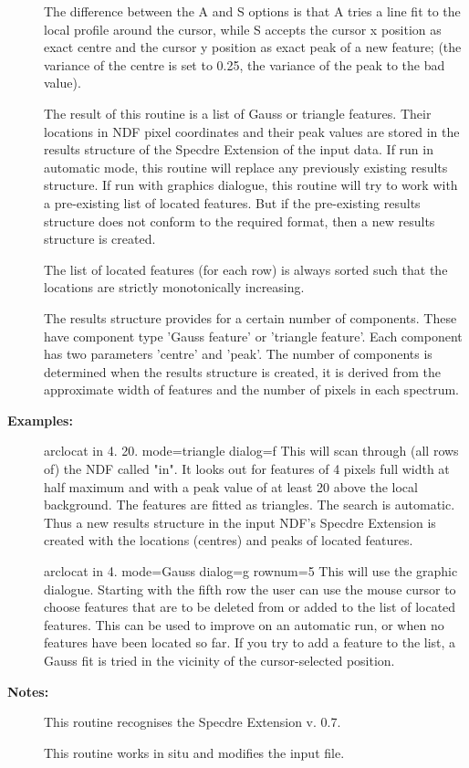 \begin{description}
\begin{terminalv}
   The difference between the A and S options is that A tries a line
   fit to the local profile around the cursor, while S accepts the
   cursor x position as exact centre and the cursor y position as
   exact peak of a new feature; (the variance of the centre is set
   to 0.25, the variance of the peak to the bad value).

   The result of this routine is a list of Gauss or triangle
   features. Their locations in NDF pixel coordinates and their peak
   values are stored in the results structure of the Specdre
   Extension of the input data. If run in automatic mode, this
   routine will replace any previously existing results structure. If
   run with graphics dialogue, this routine will try to work with a
   pre-existing list of located features. But if the pre-existing
   results structure does not conform to the required format, then a
   new results structure is created.

   The list of located features (for each row) is always sorted such
   that the locations are strictly monotonically increasing.

   The results structure provides for a certain number of components.
   These have component type 'Gauss feature' or 'triangle feature'.
   Each component has two parameters 'centre' and 'peak'. The number
   of components is determined when the results structure is created,
   it is derived from the approximate width of features and the
   number of pixels in each spectrum.

\end{terminalv}

\item [\textbf{Examples:}]
\begin{terminalv}
arclocat in 4. 20. mode=triangle dialog=f
   This will scan through (all rows of) the NDF called "in". It
   looks out for features of 4 pixels full width at half maximum
   and with a peak value of at least 20 above the local
   background. The features are fitted as triangles. The search is
   automatic. Thus a new results structure in the input NDF's
   Specdre Extension is created with the locations (centres) and
   peaks of located features.

arclocat in 4. mode=Gauss dialog=g rownum=5
   This will use the graphic dialogue. Starting with the fifth row
   the user can use the mouse cursor to choose features that are
   to be deleted from or added to the list of located features.
   This can be used to improve on an automatic run, or when no
   features have been located so far. If you try to add a feature
   to the list, a Gauss fit is tried in the vicinity of the
   cursor-selected position.

\end{terminalv}

\item [\textbf{Notes:}]
This routine recognises the Specdre Extension v. 0.7.

This routine works in situ and modifies the input file.

\end{description}
